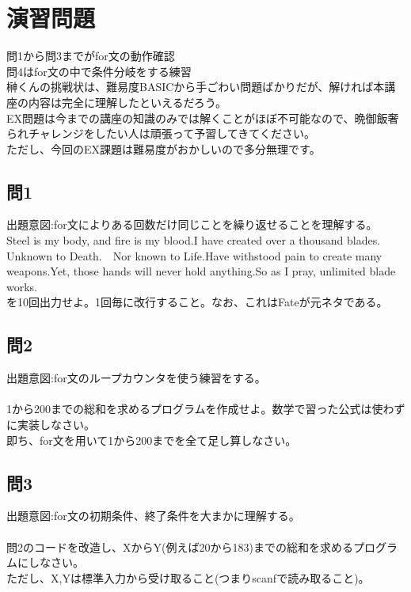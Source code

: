 \documentclass[a4j,titlepage,dvipdfmx]{jsarticle}   %
\begin{document}
\section{演習問題}
問1から問3までがfor文の動作確認\\
問4はfor文の中で条件分岐をする練習\\
榊くんの挑戦状は、難易度BASICから手ごわい問題ばかりだが、解ければ本講座の内容は完全に理解したといえるだろう。\\
EX問題は今までの講座の知識のみでは解くことがほぼ不可能なので、晩御飯奢られチャレンジをしたい人は頑張って予習してきてください。\\
ただし、今回のEX課題は難易度がおかしいので多分無理です。\\

\subsection{問1}
出題意図:for文によりある回数だけ同じことを繰り返せることを理解する。\\

Steel is my body, and fire is my blood.I have created over a thousand blades.　Unknown to Death.　Nor known to Life.Have withstood pain to create many weapons.Yet, those hands will never hold anything.So as I pray, unlimited blade works.\\
を10回出力せよ。1回毎に改行すること。なお、これはFateが元ネタである。\\

\subsection{問2}
出題意図:for文のループカウンタを使う練習をする。\\
\\
1から200までの総和を求めるプログラムを作成せよ。数学で習った公式は使わずに実装しなさい。\\
即ち、for文を用いて1から200までを全て足し算しなさい。\\

\subsection{問3}
出題意図:for文の初期条件、終了条件を大まかに理解する。\\
\\
問2のコードを改造し、XからY(例えば20から183)までの総和を求めるプログラムにしなさい。\\
ただし、X,Yは標準入力から受け取ること(つまりscanfで読み取ること)。\\
\end{document}
